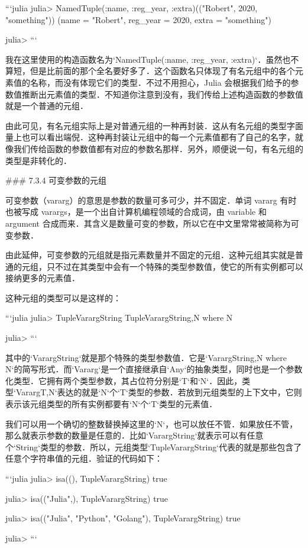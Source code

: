 ```julia
julia> NamedTuple{(:name, :reg_year, :extra)}(("Robert", 2020, "something"))
(name = "Robert", reg_year = 2020, extra = "something")

julia> 
```

我在这里使用的构造函数名为`NamedTuple{(:name, :reg_year, :extra)}`．虽然也不算短，但是比前面的那个全名要好多了．这个函数名只体现了有名元组中的各个元素值的名称，而没有体现它们的类型．不过不用担心，Julia 会根据我们给予的参数值推断出元素值的类型．不知道你注意到没有，我们传给上述构造函数的参数值就是一个普通的元组．

由此可见，有名元组实际上是对普通元组的一种再封装．这从有名元组的类型字面量上也可以看出端倪．这种再封装让元组中的每一个元素值都有了自己的名字，就像我们传给函数的参数值都有对应的参数名那样．另外，顺便说一句，有名元组的类型是非转化的．

### 7.3.4 可变参数的元组

可变参数（vararg）的意思是参数的数量可多可少，并不固定．单词 vararg 有时也被写成 varargs，是一个出自计算机编程领域的合成词，由 variable 和 argument 合成而来．其含义是数量可变的参数，所以它在中文里常常被简称为可变参数．

由此延伸，可变参数的元组就是指元素数量并不固定的元组．这种元组其实就是普通的元组，只不过在其类型中会有一个特殊的类型参数值，使它的所有实例都可以接纳更多的元素值．

这种元组的类型可以是这样的：

```julia
julia> Tuple{Vararg{String}}
Tuple{Vararg{String,N} where N}

julia> 
```

其中的`Vararg{String}`就是那个特殊的类型参数值．它是`Vararg{String,N} where N`的简写形式．而`Vararg`是一个直接继承自`Any`的抽象类型，同时也是一个参数化类型．它拥有两个类型参数，其占位符分别是`T`和`N`．因此，类型`Vararg{T,N}`表达的就是`N`个`T`类型的参数．若放到元组类型的上下文中，它则表示该元组类型的所有实例都要有`N`个`T`类型的元素值．

我们可以用一个确切的整数替换掉这里的`N`，也可以放任不管．如果放任不管，那么就表示参数的数量是任意的．比如`Vararg{String}`就表示可以有任意个`String`类型的参数．所以，元组类型`Tuple{Vararg{String}}`代表的就是那些包含了任意个字符串值的元组．验证的代码如下：

```julia
julia> isa((), Tuple{Vararg{String}})
true

julia> isa(("Julia",), Tuple{Vararg{String}})
true

julia> isa(("Julia", "Python", "Golang"), Tuple{Vararg{String}})
true

julia> 
```

